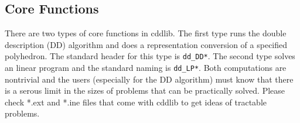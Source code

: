 \documentclass[11pt]{article}
\newcommand {\0} {{\bf 0}}
\begin{document}
\subsection{Core Functions}  \label{CoreLibrary}

There are two types of core functions in cddlib.  The first type
runs the double description (DD) algorithm and does a representation
conversion of a specified polyhedron.  The standard header
for this type is {\tt dd\_DD*}.  The second type solves
an linear program and the standard naming is
{\tt dd\_LP*}.   Both computations are nontrivial
and the users (especially for the DD algorithm) must
know that there is a serous limit in the sizes of problems
that can be practically solved. 
Please check *.ext and *.ine files that come with cddlib to get
ideas of tractable problems. 
\end{document}
